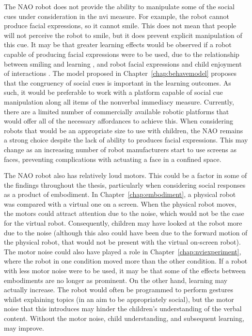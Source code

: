 The NAO robot does not provide the ability to manipulate some of the social cues under consideration in the \acrshort{nvi} measure. For example, the robot cannot produce facial expressions, so it cannot smile. This does not mean that people will not perceive the robot to smile, but it does prevent explicit manipulation of this cue. It may be that greater \gls{learning} effects would be observed if a robot capable of producing facial expressions were to be used, due to the relationship between smiling and \gls{learning} \citep{wilson2007immediacy}, and robot facial expressions and child enjoyment of interactions \citep{cameron2015presence}. The model proposed in Chapter~\ref{chap:behavemodel} proposes that the congruency of social cues is important in the learning outcomes. As such, it would be preferable to work with a platform capable of social cue manipulation along all items of the nonverbal immediacy measure. Currently, there are a limited number of commercially available robotic platforms that would offer all of the necessary affordances to achieve this. When considering robots that would be an appropriate size to use with children, the NAO remains a strong choice despite the lack of ability to produces facial expressions. This may change as an increasing number of robot manufacturers start to use screens as faces, preventing complications with actuating a face in a confined space.

The NAO robot also has relatively loud motors. This could be a factor in some of the findings throughout the thesis, particularly when considering social responses as a product of embodiment. In Chapter~\ref{chap:embodiment}, a physical robot was compared with a virtual one on a screen. When the physical robot moves, the motors could attract attention due to the noise, which would not be the case for the virtual robot. Consequently, children may have looked at the robot more due to the noise (although this also could have been due to the forward motion of the physical robot, that would not be present with the virtual on-screen robot). The motor noise could also have played a role in Chapter~\ref{chap:nviexperiment}, where the robot in one condition moved more than the other condition. If a robot with less motor noise were to be used, it may be that some of the effects between embodiments are no longer as prominent. On the other hand, learning may actually increase. The robot would often be programmed to perform gestures whilst explaining topics (in an aim to be appropriately social), but the motor noise that this introduces may hinder the children's understanding of the verbal content. Without the motor noise, child understanding, and subsequent learning, may improve.

